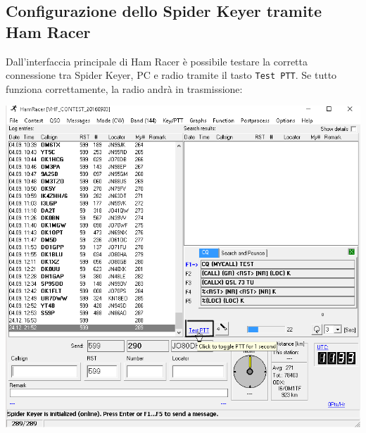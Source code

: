 \subsection{Configurazione dello Spider Keyer tramite Ham Racer}
	Dall'interfaccia principale di Ham Racer \`e possibile testare la corretta connessione tra Spider Keyer, PC e radio tramite il tasto \texttt{Test PTT}. Se tutto funziona correttamente, la radio andr\`a in trasmissione:
\begin{center}
	\includegraphics[width=\linewidth]{./config01.png}
\end{center}

